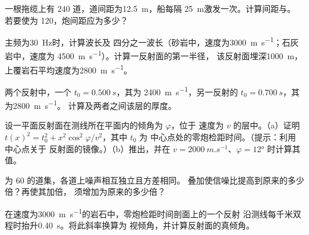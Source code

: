\begin{exercise}[$\star$]\label{exo:b3:exploration-seismology:3}
一根拖缆上有 240 道，道间距为\qty{12.5}{m}，船每隔
\qty{25}{m}激发一次。计算间距与。
若要使为 120，炮间距应为多少？
\end{exercise}

\begin{exercise}[$\star$]\label{exo:b3:exploration-seismology:4}
主频为\qty{30}{Hz}时，计算波长及
四分之一波长（砂岩中，速度为\qty{3000}{m.s^{-1}}；石灰岩中，速度为
\qty{4500}{m.s^{-1}}）。计算一反射面的第一半径，
该反射面埋深\qty{1000}{m}，上覆岩石平均速度为\qty{2800}{m.s^{-1}}。
\end{exercise}

\begin{exercise}[$\star\star$]\label{exo:b3:exploration-seismology:5}
两个反射中，一个 $t_0 = \qty{0.500}{s}$，其为
\qty{2400}{m.s^{-1}}，另一反射的 $t_0 = \qty{0.700}{s}$，其为\qty{2800}{m.s^{-1}}。
计算及两者之间该层的厚度。
\end{exercise}

\begin{exercise}[$\star\star$]\label{exo:b3:exploration-seismology:6}
设一平面反射面在测线所在平面内的倾角为 $\varphi$，位于
速度为 $v$ 的层中。（a）证明 $t(x)^2 = t_0^2 + x^2\cos^2\varphi/v^2$，其中 $t_0$ 为
中心点处的零炮检距时间。（提示：利用中心点关于
反射面的镜像。）（b）推出，并在
$v = \qty{2000}{m.s^{-1}}$、$\varphi = \ang{12}$ 时计算其值。
\end{exercise}

\begin{exercise}[$\star\star$]\label{exo:b3:exploration-seismology:7}
为 60 的道集，各道上噪声相互独立且方差相同。
叠加使信噪比提高到原来的多少倍？再使其加倍，
须增加为原来的多少倍？
\end{exercise}

\begin{exercise}[$\star\star$]\label{exo:b3:exploration-seismology:8}
在速度为\qty{3000}{m.s^{-1}}的岩石中，零炮检距时间剖面上的一个反射
沿测线每千米双程时抬升\qty{0.40}{s}。将此斜率换算为
视倾角，并计算反射面的真倾角。
\end{exercise}

